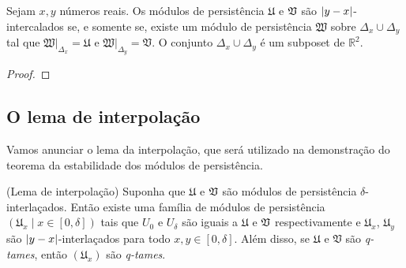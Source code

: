 \begin{propo}\label{teo:prop_inter}
Sejam $x,y$ números reais. Os módulos de persistência $\mathfrak{U}$ 
e $\mathfrak{V}$ são $\left\lvert y-x\right\rvert$-intercalados se, e somente se, existe 
um módulo de persistência $\mathfrak{W}$ sobre $\Delta_x \cup
\Delta_y$ tal que $\left.\mathfrak{W}\right|_{\Delta_x} = 
\mathfrak{U}$ e  $\left.\mathfrak{W}\right|_{\Delta_y} = 
\mathfrak{V}$. O conjunto $\Delta_x \cup \Delta_y$ é um subposet
de $\mathbb{R}^2$.  
\end{propo}
\begin{proof}

\end{proof}

\subsection{O lema de interpolação}

Vamos anunciar o lema da interpolação, que será utilizado na 
demonstração do teorema da estabilidade dos módulos de persistência.

\begin{lema}{(Lema de interpolação)}\label{teo:lema_interp}
Suponha que $\mathfrak{U}$ e $\mathfrak{V}$ são módulos de persistência
$\delta$-interlaçados. Então existe uma família de módulos de 
persistência $(\mathfrak{U}_x \mid x \in [0,\delta])$ tais que 
$U_0$ e $U_\delta$ são iguais a $\mathfrak{U}$ e $\mathfrak{V}$ 
respectivamente e $\mathfrak{U}_x$, $\mathfrak{U}_y$ são 
$\left\lvert y-x\right\rvert$-interlaçados para todo $x,y \in [0,\delta]$. Além disso,
se $\mathfrak{U}$ e $\mathfrak{V}$ são \textit{q-tames}, então 
$(\mathfrak{U}_x)$ são \textit{q-tames}.
\end{lema}

